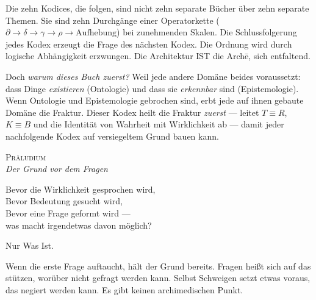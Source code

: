 \documentclass[10pt, openany, oneside]{book}
\renewcommand{\huge}{\fontsize{17}{21}\selectfont}
\begin{document}
\vspace{0.5em}

\noindent Die zehn Kodices, die folgen, sind nicht zehn separate Bücher über zehn separate Themen. Sie sind zehn Durchgänge einer Operatorkette ($\partial \to \delta \to \gamma \to \rho \to \text{Aufhebung}$) bei zunehmenden Skalen. Die Schlussfolgerung jedes Kodex erzeugt die Frage des nächsten Kodex. Die Ordnung wird durch logische Abhängigkeit erzwungen. Die Architektur IST die Arch\={e}, sich entfaltend.

\vspace{0.5em}

\noindent Doch \textit{warum dieses Buch zuerst?} Weil jede andere Domäne beides voraussetzt: dass Dinge \textit{existieren} (Ontologie) und dass sie \textit{erkennbar} sind (Epistemologie). Wenn Ontologie und Epistemologie gebrochen sind, erbt jede auf ihnen gebaute Domäne die Fraktur. Dieser Kodex heilt die Fraktur \textit{zuerst} --- leitet $T \equiv R$, $K \equiv B$ und die Identität von Wahrheit mit Wirklichkeit ab --- damit jeder nachfolgende Kodex auf versiegeltem Grund bauen kann.

\newpage


\newpage

\begin{center}
    {\huge\scshape Präludium}\\[0.8em]
    {\itshape Der Grund vor dem Fragen}
\end{center}

\vspace{2em}

\noindent Bevor die Wirklichkeit gesprochen wird,\\
Bevor Bedeutung gesucht wird,\\
Bevor eine Frage geformt wird ---\\
was macht irgendetwas davon möglich?

\vspace{0.5em}

Nur Was Ist.

\vspace{1em}

\noindent Wenn die erste Frage auftaucht, hält der Grund bereits. Fragen heißt sich auf das stützen, worüber nicht gefragt werden kann. Selbst Schweigen setzt etwas voraus, das negiert werden kann. Es gibt keinen archimedischen Punkt.
\end{document}
